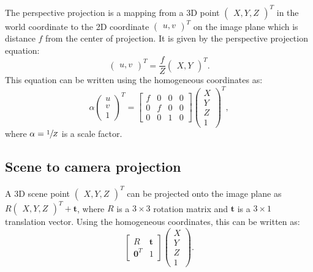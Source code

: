 The perspective projection is a mapping from a 3D point \(\begin{pmatrix}
	X, Y, Z
\end{pmatrix}^{T}\)
in the world coordinate
to the 2D coordinate \(\begin{pmatrix}
	u, v
\end{pmatrix}^{T}\)
on the image plane which is distance \(f\) from the center
of projection. It is given by the perspective projection equation:
\[
	\begin{pmatrix}
		u, v
	\end{pmatrix}^{T} = \frac{f}{Z} \begin{pmatrix}
		X, Y
	\end{pmatrix}^{T}.
\]
This equation can be written using the homogeneous coordinates as:
\begin{equation} \label{eq:perspective_projection}
	\alpha \begin{pmatrix}
		u \\ v \\ 1
	\end{pmatrix}^{T} = \begin{bmatrix}
		f & 0 & 0 & 0 \\
		0 & f & 0 & 0 \\
		0 & 0 & 1 & 0
	\end{bmatrix} \begin{pmatrix}
		X \\ Y \\ Z \\ 1
	\end{pmatrix}^{T},
\end{equation}
where \(\alpha = \sfrac{1}{Z}\) is a scale factor.

\subsection{Scene to camera projection}\label{sub:scene_to_camera_projection}

A 3D scene point \(\begin{pmatrix}
	X, Y, Z
\end{pmatrix}^{T}\) can be projected onto the image plane as
\(R \begin{pmatrix}
	X, Y, Z
\end{pmatrix}^{T} + \mathbf{t}\), where \(R\) is a \(3 \times 3\) rotation matrix
and \(\mathbf{t}\) is
a \(3 \times 1\) translation vector. Using the homogeneous coordinates, this
can be written as:
\begin{equation}
	\begin{bmatrix}
		R              & \mathbf{t} \\
		\mathbf{0}^{T} & 1
	\end{bmatrix} \begin{pmatrix}
		X \\ Y \\ Z \\ 1
	\end{pmatrix}.
\end{equation}


